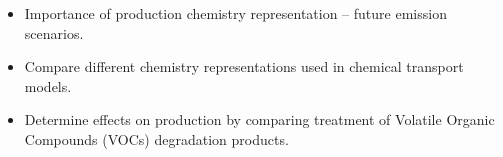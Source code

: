 \begin{BlueBox}
    \vskip-1cm
    \begin{block}{}
        \begin{itemize}
            \item Importance of  production chemistry representation -- future emission scenarios. \vspace{5mm}
            \item Compare different  chemistry representations used in chemical transport models. \vspace{5mm}
            \item Determine effects on  production by comparing treatment of Volatile Organic Compounds (VOCs) degradation products. 
        \end{itemize}
    \end{block}
\end{BlueBox}
